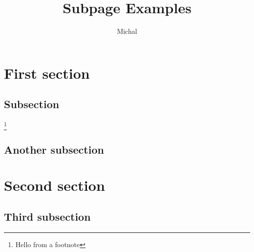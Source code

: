 \documentclass{article}
\begin{document}
\title{Subpage Examples}
\author{Michal}
\maketitle
\section{First section}
\subsection{Subsection}
\lipsum[1-2]\footnote{Hello from a footnote}
\subsection{Another subsection}
\lipsum[3-4]
\section{Second section}
\subsection{Third subsection}
\lipsum[5-6]
\end{document}
